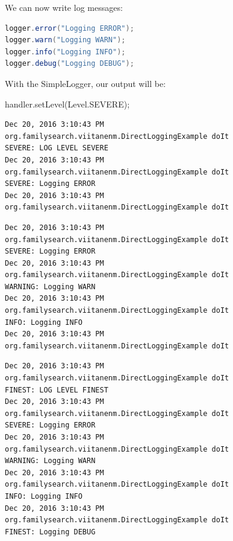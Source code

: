 We can now write log messages:

\begin{lstlisting}[language=Java]
logger.error("Logging ERROR");
logger.warn("Logging WARN");
logger.info("Logging INFO");
logger.debug("Logging DEBUG");
\end{lstlisting}

With the SimpleLogger, our output will be:


handler.setLevel(Level.SEVERE);


\begin{lstlisting}
Dec 20, 2016 3:10:43 PM org.familysearch.viitanenm.DirectLoggingExample doIt
SEVERE: LOG LEVEL SEVERE
Dec 20, 2016 3:10:43 PM org.familysearch.viitanenm.DirectLoggingExample doIt
SEVERE: Logging ERROR
Dec 20, 2016 3:10:43 PM org.familysearch.viitanenm.DirectLoggingExample doIt
\end{lstlisting}

\begin{lstlisting}
Dec 20, 2016 3:10:43 PM org.familysearch.viitanenm.DirectLoggingExample doIt
SEVERE: Logging ERROR
Dec 20, 2016 3:10:43 PM org.familysearch.viitanenm.DirectLoggingExample doIt
WARNING: Logging WARN
Dec 20, 2016 3:10:43 PM org.familysearch.viitanenm.DirectLoggingExample doIt
INFO: Logging INFO
Dec 20, 2016 3:10:43 PM org.familysearch.viitanenm.DirectLoggingExample doIt
\end{lstlisting}

\begin{lstlisting}
Dec 20, 2016 3:10:43 PM org.familysearch.viitanenm.DirectLoggingExample doIt
FINEST: LOG LEVEL FINEST
Dec 20, 2016 3:10:43 PM org.familysearch.viitanenm.DirectLoggingExample doIt
SEVERE: Logging ERROR
Dec 20, 2016 3:10:43 PM org.familysearch.viitanenm.DirectLoggingExample doIt
WARNING: Logging WARN
Dec 20, 2016 3:10:43 PM org.familysearch.viitanenm.DirectLoggingExample doIt
INFO: Logging INFO
Dec 20, 2016 3:10:43 PM org.familysearch.viitanenm.DirectLoggingExample doIt
FINEST: Logging DEBUG
\end{lstlisting}